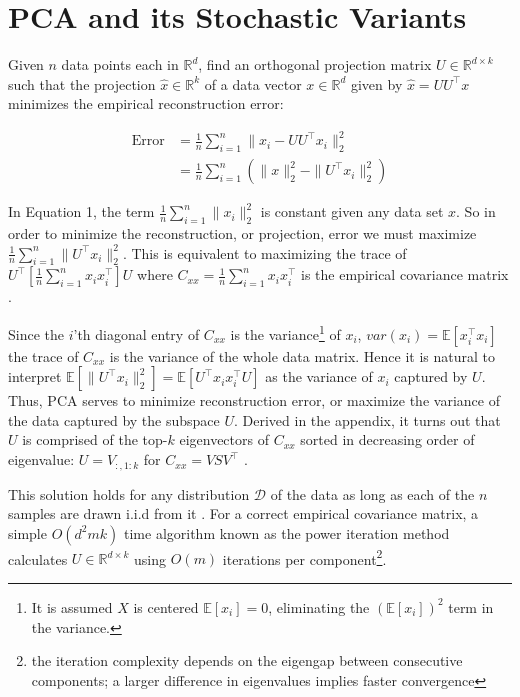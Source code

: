 \documentclass[11pt,letterpaper]{article}
\begin{document}
\section{PCA and its Stochastic Variants}

Given $n$ data points each in $\mathbb{R}^d$, find an orthogonal projection matrix $U \in \mathbb{R}^{d \times k}$ such that the projection $\hat{x} \in \mathbb{R}^k$ of a data vector $x \in \mathbb{R}^{d}$ given by $\hat{x}=UU^\top x$ minimizes the empirical reconstruction error:

\begin{equation}
\begin{aligned}
\text{Error} &= \frac{1}{n} \sum_{i=1}^n \| x_i-UU^\top x_i \|^2_2 \\
&=\frac{1}{n}\sum_{i=1}^n \left(\|x\|_2^2- \|U^\top x_i\|_2^2 \right)
\end{aligned}
\end{equation}

In Equation 1, the term $\frac{1}{n} \sum_{i=1}^n \| x_i \|^2_2$ is constant given any data set $x$. So in order to minimize the reconstruction, or projection, error we must maximize $\frac{1}{n} \sum_{i=1}^n \|U^\top x_i\|_2^2$. This is equivalent to maximizing the trace of $U^\top {\left[\displaystyle \frac{1}{n} \sum_{i=1}^n x_i x_i^\top \right]} U$ where $C_{xx} = \frac{1}{n} \sum_{i=1}^n x_i x_i^\top $ is the empirical covariance matrix \cite{jolliffe}.

Since the $i$'th diagonal entry of $C_{xx}$ is the variance\footnote{It is assumed $X$ is centered $\mathbb{E}[x_i] = 0$, eliminating the $(\mathbb{E}[x_i])^2$ term in the variance.} of $x_i$, $var(x_i) = \mathbb{E}[x_i^{\top} x_i]$ the trace of $C_{xx}$ is the variance of the whole data matrix. Hence it is natural to interpret $ \mathbb{E}[\|U^\top x_i\|_2^2] =  \mathbb{E}[U^\top x_ix_i^{\top}U]$ as the variance of $x_i$ captured by $U$. Thus, PCA serves to minimize reconstruction error, or maximize the variance of the data captured by the subspace $U$. Derived in the appendix, it turns out that $U$ is comprised of the top-$k$ eigenvectors of $C_{xx}$ sorted in decreasing order of eigenvalue: $U = V_{:, 1:k}$ for $C_{xx} = VSV^{\top}$ \cite{jolliffe}. 

This solution holds for any distribution $\mathcal{D}$ of the data as long as each of the $n$ samples are drawn i.i.d from it \cite{jolliffe}. For a correct empirical covariance matrix, a simple $O(d^2mk)$ time algorithm known as the power iteration method calculates $U \in \mathbb{R}^{d \times k}$ using $O(m)$ iterations per component\footnote{the iteration complexity depends on the eigengap between consecutive components; a larger difference in eigenvalues implies faster convergence}. 
\end{document}
